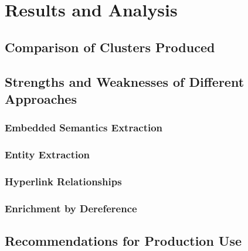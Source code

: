 \chapter{Results and Analysis}

\section{Comparison of Clusters Produced}

\section{Strengths and Weaknesses of Different Approaches}

\subsection{Embedded Semantics Extraction}
\subsection{Entity Extraction}
\subsection{Hyperlink Relationships}
\subsection{Enrichment by Dereference}

\section{Recommendations for Production Use}
